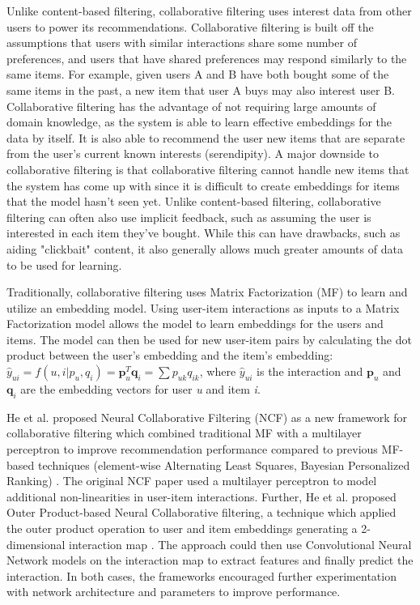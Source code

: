 \documentclass{article}
\begin{document}
Unlike content-based filtering, collaborative filtering uses interest data from other users to power its recommendations. Collaborative filtering is built off the assumptions that users with similar interactions share some number of preferences, and users that have shared preferences may respond similarly to the same items. For example, given users A and B have both bought some of the same items in the past, a new item that user A buys may also interest user B. Collaborative filtering has the advantage of not requiring large amounts of domain knowledge, as the system is able to learn effective embeddings for the data by itself. It is also able to recommend the user new items that are separate from the user's current known interests (serendipity). A major downside to collaborative filtering is that collaborative filtering cannot handle new items that the system has come up with since it is difficult to create embeddings for items that the model hasn’t seen yet. Unlike content-based filtering, collaborative filtering can often also use implicit feedback, such as assuming the user is interested in each item they've bought. While this can have drawbacks, such as aiding "clickbait" content, it also generally allows much greater amounts of data to be used for learning.

Traditionally, collaborative filtering uses Matrix Factorization (MF) to learn and utilize an embedding model. Using user-item interactions as inputs to a Matrix Factorization model allows the model to learn embeddings for the users and items. The model can then be used for new user-item pairs by calculating the dot product between the user's embedding and the item's embedding: $\hat{y}_{ui} = f(u,i|p_u,q_i) = \textbf{p}^T_u\textbf{q}_i = \sum{p_{uk}q_{ik}}$, where $\hat{y}_{ui}$ is the interaction and $\textbf{p}_u$ and $\textbf{q}_i$ are the embedding vectors for user \textit{u} and item \textit{i}.

He et al. proposed Neural Collaborative Filtering (NCF) as a new framework for collaborative filtering which combined traditional MF with a multilayer perceptron to improve recommendation performance compared to previous MF-based techniques (element-wise Alternating Least Squares, Bayesian Personalized Ranking) \cite{he2017neural}. The original NCF paper used a multilayer perceptron to model additional non-linearities in user-item interactions. Further, He et al. proposed Outer Product-based Neural Collaborative filtering, a technique which applied the outer product operation to user and item embeddings generating a 2-dimensional interaction map \cite{he2018outer}. The approach could then use Convolutional Neural Network models on the interaction map to extract features and finally predict the interaction. In both cases, the frameworks encouraged further experimentation with network architecture and parameters to improve performance.
\end{document}
